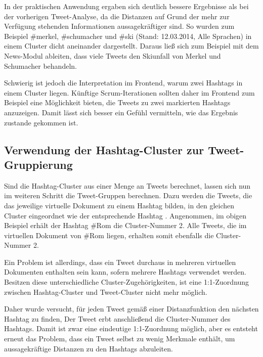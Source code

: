 In der praktischen Anwendung ergaben sich deutlich bessere Ergebnisse als bei der vorherigen Tweet-Analyse, da die Distanzen auf Grund der mehr zur Verfügung stehenden Informationen aussagekräftiger sind. So wurden zum Beispiel \glqq \#merkel\grqq{}, \glqq \#schumacher\grqq{} und \glqq \#ski\grqq{} (Stand: 12.03.2014, \glqq Alle Sprachen\grqq{}) in einem Cluster dicht aneinander dargestellt. Daraus ließ sich zum Beispiel mit dem News-Modul ableiten, dass viele Tweets den Skiunfall von Merkel und Schumacher behandeln. 

Schwierig ist jedoch die Interpretation im Frontend, warum zwei Hashtags in einem Cluster liegen. Künftige Scrum-Iterationen sollten daher im Frontend zum Beispiel eine Möglichkeit bieten, die Tweets zu zwei markierten Hashtags anzuzeigen. Damit lässt sich besser ein Gefühl vermitteln, wie das Ergebnis zustande gekommen ist.


\subsection{Verwendung der Hashtag-Cluster zur Tweet-Gruppierung} \label{subsec:ClusterTweetsWithHashtags}
Sind die Hashtag-Cluster aus einer Menge an Tweets berechnet, lassen sich nun im wei\-te\-ren Schritt die Tweet-Gruppen berechnen.
Dazu werden die Tweets, die das jeweilige virtuelle Dokument zu einem Hashtag bilden, in den gleichen Cluster eingeordnet wie der entsprechende Hashtag \cite{TsurLittman}. Angenommen, im obigen Beispiel erhält der Hashtag \glqq \#Rom\grqq{} die Cluster-Nummer 2. Alle Tweets, die im virtuellen Dokument von \glqq \#Rom\grqq{} liegen, erhalten somit ebenfalls die Cluster-Nummer 2. 

Ein Problem ist allerdings, dass ein Tweet durchaus in mehreren virtuellen Dokumenten enthalten sein kann, sofern mehrere Hashtags verwendet werden. Besitzen diese unterschiedliche Cluster-Zugehörigkeiten, ist eine 1:1-Zuordnung zwi\-schen Hashtag-Cluster und Tweet-Cluster nicht mehr möglich.

Daher wurde versucht, für jeden Tweet gemäß einer Distanzfunktion den nächsten Hash\-tag zu finden, Der Tweet erbt anschließend die Cluster-Nummer des Hashtags. Damit ist zwar eine eindeutige 1:1-Zuordnung möglich, aber es entsteht erneut das Problem, dass ein Tweet selbst zu wenig Merkmale enthält, um aussagekräftige Distanzen zu den Hashtags abzuleiten. 

